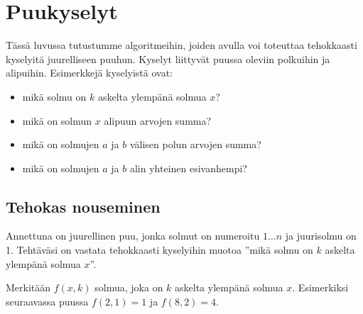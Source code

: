 \chapter{Puukyselyt}


Tässä luvussa tutustumme algoritmeihin,
joiden avulla voi toteuttaa tehokkaasti kyselyitä
juurelliseen puuhun.
Kyselyt liittyvät puussa oleviin polkuihin
ja alipuihin.
Esimerkkejä kyselyistä ovat:

\begin{itemize}
\item mikä solmu on $k$ askelta ylempänä solmua $x$?
\item mikä on solmun $x$ alipuun arvojen summa?
\item mikä on solmujen $a$ ja $b$ välisen polun arvojen summa?
\item mikä on solmujen $a$ ja $b$ alin yhteinen esivanhempi?
\end{itemize}

\section{Tehokas nouseminen}

\begin{task}
Annettuna on juurellinen puu, jonka solmut on numeroitu
$1 \ldots n$ ja juurisolmu on 1.
Tehtäväsi on vastata
tehokkaasti kyselyihin muotoa ''mikä solmu on
$k$ askelta ylempänä solmua $x$''.
\end{task}

Merkitään $f(x,k)$ solmua,
joka on $k$ askelta ylempänä solmua $x$.
Esimerkiksi seuraavassa puussa
$f(2,1)=1$ ja $f(8,2)=4$.

\begin{center}
\end{center}

